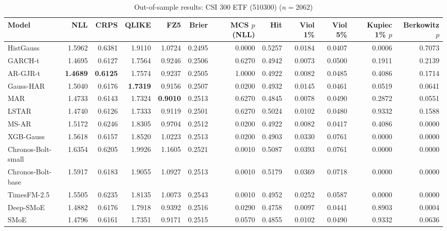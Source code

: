 \begin{table}[!htbp]\centering\scriptsize
\caption{Out-of-sample results: CSI 300 ETF (510300) ($n=2062$)}\label{tab:asset_etf510300}
\begin{adjustbox}{max width=\textwidth}
\begin{tabular}{lrrrrrrrrrrr}
\toprule
Model & NLL & CRPS & QLIKE & FZ5 & Brier & MCS $p$ (NLL) & Hit & Viol 1\% & Viol 5\% & Kupiec 1\% $p$ & Berkowitz $p$\\
\midrule
HistGauss & 1.5962 & 0.6381 & 1.9110 & 1.0724 & 0.2495 & 0.0000 & 0.5257 & 0.0184 & 0.0407 & 0.0006 & 0.7073\\
GARCH-t & 1.4695 & 0.6127 & 1.7564 & 0.9246 & 0.2506 & 0.6270 & 0.4942 & 0.0073 & 0.0500 & 0.1911 & 0.2139\\
AR-GJR-t & \textbf{1.4689} & \textbf{0.6125} & 1.7574 & 0.9237 & 0.2505 & 1.0000 & 0.4922 & 0.0082 & 0.0485 & 0.4086 & 0.1714\\
Gauss-HAR & 1.5040 & 0.6176 & \textbf{1.7319} & 0.9156 & 0.2507 & 0.0200 & 0.4932 & 0.0145 & 0.0461 & 0.0519 & 0.0641\\
MAR & 1.4733 & 0.6143 & 1.7324 & \textbf{0.9010} & 0.2513 & 0.6270 & 0.4845 & 0.0078 & 0.0490 & 0.2872 & 0.0551\\
LSTAR & 1.4740 & 0.6126 & 1.7333 & 0.9119 & 0.2501 & 0.6270 & 0.5024 & 0.0102 & 0.0480 & 0.9332 & 0.1588\\
MS-AR & 1.5172 & 0.6246 & 1.8305 & 0.9704 & 0.2512 & 0.0200 & 0.4922 & 0.0082 & 0.0417 & 0.4086 & 0.0000\\
XGB-Gauss & 1.5618 & 0.6157 & 1.8520 & 1.0223 & 0.2513 & 0.0200 & 0.4903 & 0.0330 & 0.0761 & 0.0000 & 0.0000\\
Chronos-Bolt-small & 1.6354 & 0.6205 & 1.9926 & 1.1605 & 0.2521 & 0.0010 & 0.5087 & 0.0393 & 0.0761 & 0.0000 & 0.0000\\
Chronos-Bolt-base & 1.5917 & 0.6183 & 1.9055 & 1.0927 & 0.2513 & 0.0010 & 0.5179 & 0.0369 & 0.0718 & 0.0000 & 0.0000\\
TimesFM-2.5 & 1.5505 & 0.6235 & 1.8135 & 1.0073 & 0.2543 & 0.0010 & 0.4952 & 0.0252 & 0.0587 & 0.0000 & 0.0000\\
Deep-SMoE & 1.4882 & 0.6176 & 1.7918 & 0.9392 & 0.2516 & 0.0290 & 0.4758 & 0.0097 & 0.0441 & 0.8903 & 0.0004\\
SMoE & 1.4796 & 0.6161 & 1.7351 & 0.9171 & 0.2515 & 0.0570 & 0.4855 & 0.0102 & 0.0490 & 0.9332 & 0.0636\\
\bottomrule
\end{tabular}
\end{adjustbox}
\end{table}